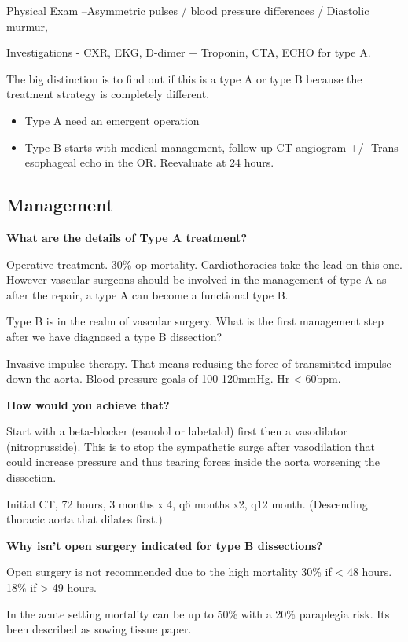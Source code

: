 \documentclass[
]{book}
\begin{document}
Physical Exam --Asymmetric pulses / blood pressure differences /
Diastolic murmur,

Investigations - CXR, EKG, D-dimer + Troponin, CTA, ECHO for type A.

The big distinction is to find out if this is a type A or type B because
the treatment strategy is completely different.

\begin{itemize}
\item
  Type A need an emergent operation
\item
  Type B starts with medical management, follow up CT angiogram +/-
  Trans esophageal echo in the OR. Reevaluate at 24 hours.
\end{itemize}

\hypertarget{management-27}{%
\subsection{Management}\label{management-27}}

\textbf{What are the details of Type A treatment?}

Operative treatment. 30\% op mortality. Cardiothoracics take the lead on
this one. However vascular surgeons should be involved in the management
of type A as after the repair, a type A can become a functional type B.

Type B is in the realm of vascular surgery. What is the first management
step after we have diagnosed a type B dissection?

Invasive impulse therapy. That means redusing the force of transmitted
impulse down the aorta. Blood pressure goals of 100-120mmHg. Hr \textless{}
60bpm.

\textbf{How would you achieve that?}

Start with a beta-blocker (esmolol or labetalol) first then a
vasodilator (nitroprusside). This is to stop the sympathetic surge after
vasodilation that could increase pressure and thus tearing forces inside
the aorta worsening the dissection.

Initial CT, 72 hours, 3 months x 4, q6 months x2, q12 month. (Descending
thoracic aorta that dilates first.)

\textbf{Why isn't open surgery indicated for type B dissections?}

Open surgery is not recommended due to the high mortality 30\% if \textless{} 48
hours. 18\% if \textgreater{} 49 hours.

In the acute setting mortality can be up to 50\% with a 20\% paraplegia
risk. Its been described as sowing tissue paper.
\end{document}
